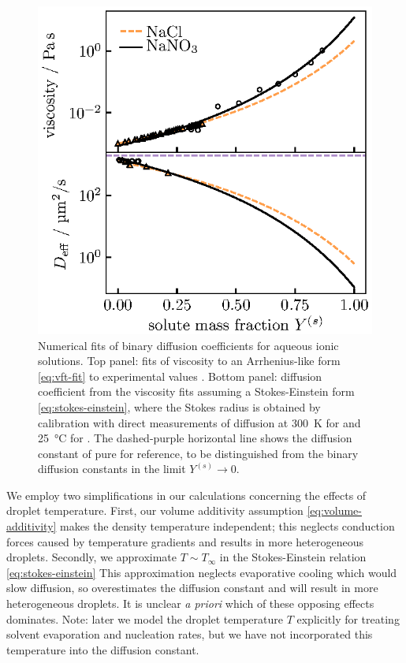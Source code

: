 \documentclass[11pt,twoside]{report}
\begin{document}
\begin{figure}
  \includegraphics[width=0.9\linewidth,outer]{aerosol-diffusion-fit}
  \caption[Viscosity and diffusion coefficients of aqueous ionic solutions]{
    Numerical fits of binary diffusion coefficients for aqueous ionic solutions.
    Top panel: fits of viscosity to an Arrhenius-like form \eqref{eq:vft-fit} to experimental values \cite{?,PowerCS2013}.
    Bottom panel: diffusion coefficient from the viscosity fits assuming a Stokes-Einstein form \eqref{eq:stokes-einstein}, where the Stokes radius is obtained by calibration with direct measurements of diffusion at \SI{300}{\kelvin} for  \cite{LyubartsevJPC1996} and \SI{25}{\celsius} for  \cite{YehJCED1970}.
    The dashed-purple horizontal line shows the diffusion constant of pure  for reference, to be distinguished from the binary diffusion constants in the limit $Y^{(s)} \to 0$.}
  \label{fig:diffusion-fit}
\end{figure}

We employ two simplifications in our calculations concerning the effects of droplet temperature.
First, our volume additivity assumption \eqref{eq:volume-additivity} makes the density temperature independent; this neglects conduction forces caused by temperature gradients and results in more heterogeneous droplets.
Secondly, we approximate $T \sim T_\infty$ in the Stokes-Einstein relation \eqref{eq:stokes-einstein}
This approximation neglects evaporative cooling which would slow diffusion, so overestimates the diffusion constant and will result in more heterogeneous droplets.
It is unclear \emph{a priori} which of these opposing effects dominates.
Note: later we model the droplet temperature $T$ explicitly for treating solvent evaporation and nucleation rates, but we have not incorporated this temperature into the diffusion constant.
\end{document}

